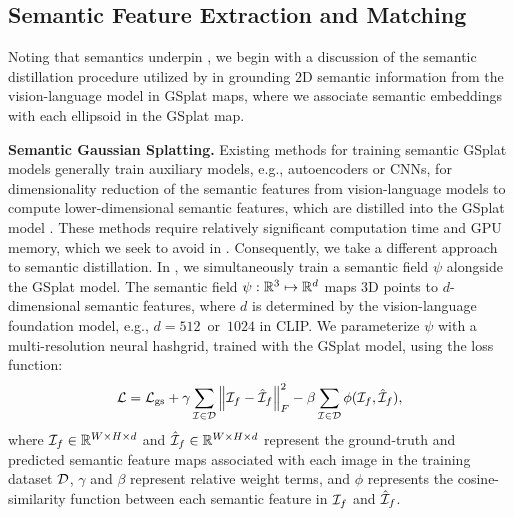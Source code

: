 \subsection{Semantic Feature Extraction and Matching}
Noting that semantics underpin \algname, we begin with a discussion of the semantic distillation procedure utilized by \algname in grounding $2$D semantic information from the vision-language model in GSplat maps, where we associate semantic embeddings with each ellipsoid in the GSplat map. 

\smallskip
\noindent\textbf{Semantic Gaussian Splatting.}
Existing methods for training semantic GSplat models generally train auxiliary models, e.g., autoencoders or CNNs, for dimensionality reduction of the semantic features from vision-language models to compute lower-dimensional semantic features, which are distilled into the GSplat model \cite{qin2024langsplat, zhou2024feature}. These methods require relatively significant computation time and GPU memory, which we seek to avoid in \algname. Consequently, we take a different approach to semantic distillation. In \algname, we simultaneously train a semantic field $\psi$ alongside the GSplat model. The semantic field ${\psi: \mathbb{R}^{3} \mapsto \mathbb{R}^{d}}$ maps $3$D points to $d$-dimensional semantic features, where $d$ is determined by the vision-language foundation model, e.g., ${d = 512}$~or~${1024}$ in CLIP. We parameterize ${\psi}$ with a multi-resolution neural hashgrid, trained with the GSplat model, using the loss function:
\begin{equation}
    \label{eq:semantics_loss_function}
    \mathcal{L} = \mathcal{L}_{\mathrm{gs}} + \gamma \sum_{\mathcal{I} \in \mathcal{D}} \left\Vert \mathcal{I}_{f} - \hat{\mathcal{I}}_{f} \right\Vert_{F}^{2} - \beta \sum_{\mathcal{I} \in \mathcal{D}} \phi(\mathcal{I}_{f}, \hat{\mathcal{I}}_{f}),
\end{equation}
where ${\mathcal{I}_{f} \in \mathbb{R}^{W \times H \times d}}$ and ${\hat{\mathcal{I}}_{f} \in \mathbb{R}^{W \times H \times d}}$ represent the ground-truth and predicted semantic feature maps associated with each image in the training dataset $\mathcal{D}$, $\gamma$ and $\beta$ represent relative weight terms, and $\phi$ represents the cosine-similarity function between each semantic feature in $\mathcal{I}_{f}$ and $\hat{\mathcal{I}}_{f}$. 

